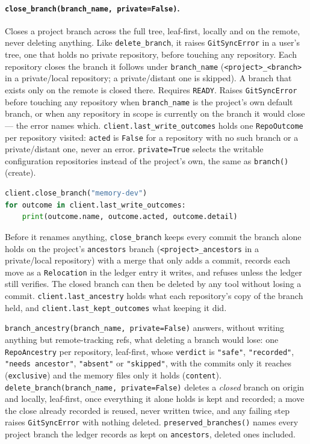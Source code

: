 \paragraph{\texttt{close\_branch(branch\_name, private=False)}.} Closes a
project branch across the full tree, leaf-first, locally and on the
remote, never deleting anything. Like \texttt{delete\_branch}, it raises
\texttt{GitSyncError} in a user's tree, one that holds no private repository,
before touching any repository. Each repository closes the branch it
follows under \texttt{branch\_name} (\texttt{<project>\_<branch>} in a
private/local repository; a private/distant one is skipped). A branch that
exists only on the remote is closed there. Requires \texttt{READY}. Raises
\texttt{GitSyncError} before touching any repository when
\texttt{branch\_name} is the project's own default branch, or when any
repository in scope is currently on the branch it would close --- the
error names which. \texttt{client.last\_write\_outcomes} holds one
\texttt{RepoOutcome} per repository visited: \texttt{acted} is
\texttt{False} for a repository with no such branch or a private/distant
one, never an error. \texttt{private=True} selects the writable
configuration repositories instead of the project's own, the same as
\texttt{branch()} (create).

\begin{lstlisting}[language=Python]
client.close_branch("memory-dev")
for outcome in client.last_write_outcomes:
    print(outcome.name, outcome.acted, outcome.detail)
\end{lstlisting}

Before it renames anything, \texttt{close\_branch} keeps every commit the
branch alone holds on the project's \texttt{ancestors} branch
(\texttt{<project>\_ancestors} in a private/local repository) with a merge
that only adds a commit, records each move as a \texttt{Relocation} in the
ledger entry it writes, and refuses unless the ledger still verifies. The
closed branch can then be deleted by any tool without losing a commit.
\texttt{client.last\_ancestry} holds what each repository's copy of the
branch held, and \texttt{client.last\_kept\_outcomes} what keeping it did.

\texttt{branch\_ancestry(branch\_name, private=False)} answers, without
writing anything but remote-tracking refs, what deleting a branch would
lose: one \texttt{RepoAncestry} per repository, leaf-first, whose
\texttt{verdict} is \texttt{"safe"}, \texttt{"recorded"},
\texttt{"needs ancestor"}, \texttt{"absent"} or \texttt{"skipped"}, with
the commits only it reaches (\texttt{exclusive}) and the memory files only
it holds (\texttt{content}). \texttt{delete\_branch(branch\_name,
private=False)} deletes a \emph{closed} branch on origin and locally,
leaf-first, once everything it alone holds is kept and recorded; a move the
close already recorded is reused, never written twice, and any failing step
raises \texttt{GitSyncError} with nothing deleted.
\texttt{preserved\_branches()} names every project branch the ledger
records as kept on \texttt{ancestors}, deleted ones included.


